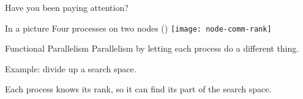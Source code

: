 
\begin{frame}{Have you been paying attention?}
  
\end{frame}

\begin{exerciseframe}[commrank]
  
\end{exerciseframe}

\begin{exerciseframe}[commrank]
  
\end{exerciseframe}

\begin{optexerciseframe}
  
\end{optexerciseframe}


\begin{frame}{In a picture}
  Four processes on two nodes ()
  \texttt{[image: node-comm-rank]}
\end{frame}


\begin{frame}{Functional Parallelism}
  Parallelism by letting each process do a different thing.

  Example: divide up a search space.

  Each process knows its rank, so it can find its part of the search space.
\end{frame}

\begin{exerciseframe}[prime]
  
\end{exerciseframe}

\endinput

\begin{frame}[containsverbatim]\frametitle{}
\begin{lstlisting}
  
\end{lstlisting}
\end{frame}

